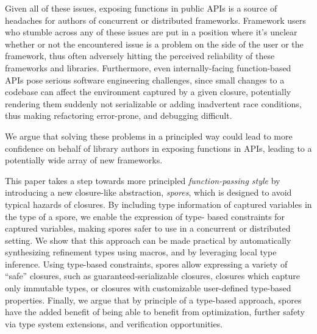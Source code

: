 \documentclass{llncs}
\begin{document}
Given all of these issues, exposing functions in public APIs is a source of
headaches for authors of concurrent or distributed frameworks. Framework users
who stumble across any of these issues are put in a position where it's
unclear whether or not the encountered issue is a problem on the side of the
user or the framework, thus often adversely hitting the perceived reliability
of these frameworks and libraries. Furthermore, even internally-facing
function-based APIs pose serious software engineering challenges, since small
changes to a codebase can affect the environment captured by a given closure,
potentially rendering them suddenly not serializable or adding inadvertent
race conditions, thus making refactoring error-prone, and debugging difficult.

We argue that solving these problems in a principled way could lead to more
confidence on behalf of library authors in exposing functions in APIs, leading
to a potentially wide array of new frameworks.

This paper takes a step towards more principled {\em function-passing style}
by introducing a new closure-like abstraction, {\em spores}, which is designed
to avoid typical hazards of closures. By including type information of
captured variables in the type of a spore, we enable the expression of type-
based constraints for captured variables, making spores safer to use in a
concurrent or distributed setting. We show that this approach can be made
practical by automatically synthesizing refinement types using macros, and by
leveraging local type inference. Using type-based constraints, spores allow
expressing a variety of ``safe'' closures, such as guaranteed-serializable
closures, closures which capture only immutable types, or closures with
customizable user-defined type-based properties. Finally, we argue that by
principle of a type-based approach, spores have the added benefit of being
able to benefit from optimization, further safety via type system extensions,
and verification opportunities.
\end{document}
